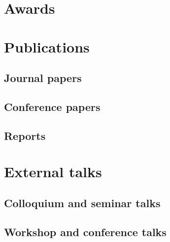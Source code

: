 \documentclass{article}
\begin{document}

\section*{Awards}




\section*{Publications}

\subsection*{Journal papers}



\subsection*{Conference papers}



\subsection*{Reports}




\section*{External talks}

\subsection*{Colloquium and seminar talks}



\subsection*{Workshop and conference talks}



\end{document}
